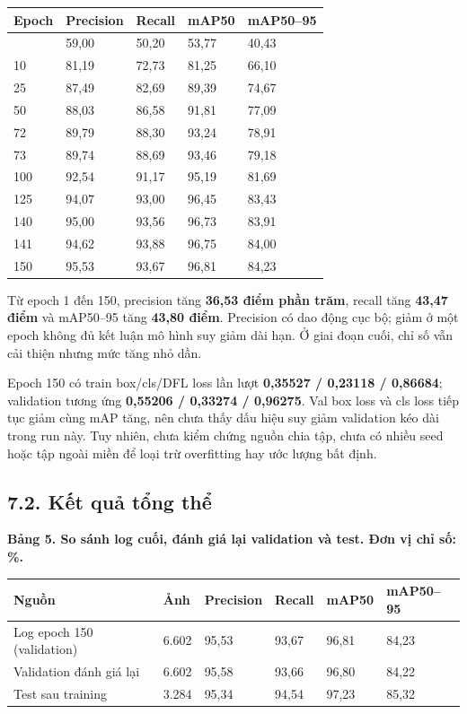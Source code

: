 \documentclass[
  vietnamese,
  12pt,
  a4paper,
]{article}
\newcounter{none} %
\begin{document}
{\def\LTcaptype{none} %
\begin{longtable}[]{@{}lllll@{}}
\toprule\noalign{}
Epoch & Precision & Recall & mAP50 & mAP50--95 \\
\midrule\noalign{}
\endhead
\bottomrule\noalign{}
\endlastfoot
1 & 59,00 & 50,20 & 53,77 & 40,43 \\
10 & 81,19 & 72,73 & 81,25 & 66,10 \\
25 & 87,49 & 82,69 & 89,39 & 74,67 \\
50 & 88,03 & 86,58 & 91,81 & 77,09 \\
72 & 89,79 & 88,30 & 93,24 & 78,91 \\
73 & 89,74 & 88,69 & 93,46 & 79,18 \\
100 & 92,54 & 91,17 & 95,19 & 81,69 \\
125 & 94,07 & 93,00 & 96,45 & 83,43 \\
140 & 95,00 & 93,56 & 96,73 & 83,91 \\
141 & 94,62 & 93,88 & 96,75 & 84,00 \\
150 & 95,53 & 93,67 & 96,81 & 84,23 \\
\end{longtable}
}

\endgroup

Từ epoch 1 đến 150, precision tăng \textbf{36,53 điểm phần trăm}, recall
tăng \textbf{43,47 điểm} và mAP50--95 tăng \textbf{43,80 điểm}.
Precision có dao động cục bộ; giảm ở một epoch không đủ kết luận mô hình
suy giảm dài hạn. Ở giai đoạn cuối, chỉ số vẫn cải thiện nhưng mức tăng
nhỏ dần.

Epoch 150 có train box/cls/DFL loss lần lượt \textbf{0,35527 / 0,23118 /
0,86684}; validation tương ứng \textbf{0,55206 / 0,33274 / 0,96275}. Val
box loss và cls loss tiếp tục giảm cùng mAP tăng, nên chưa thấy dấu hiệu
suy giảm validation kéo dài trong run này. Tuy nhiên, chưa kiểm chứng
nguồn chia tập, chưa có nhiều seed hoặc tập ngoài miền để loại trừ
overfitting hay ước lượng bất định.

\subsection{7.2. Kết quả tổng
thể}\label{kux1ebft-quux1ea3-tux1ed5ng-thux1ec3}

\textbf{Bảng 5. So sánh log cuối, đánh giá lại validation và test. Đơn
vị chỉ số: \%.}

\begingroup\small\setlength{\tabcolsep}{4pt}\renewcommand{\arraystretch}{1.12}

{\def\LTcaptype{none} %
\begin{longtable}[]{@{}llllll@{}}
\toprule\noalign{}
Nguồn & Ảnh & Precision & Recall & mAP50 & mAP50--95 \\
\midrule\noalign{}
\endhead
\bottomrule\noalign{}
\endlastfoot
Log epoch 150 (validation) & 6.602 & 95,53 & 93,67 & 96,81 & 84,23 \\
Validation đánh giá lại & 6.602 & 95,58 & 93,66 & 96,80 & 84,22 \\
Test sau training & 3.284 & 95,34 & 94,54 & 97,23 & 85,32 \\
\end{longtable}
}
\end{document}
